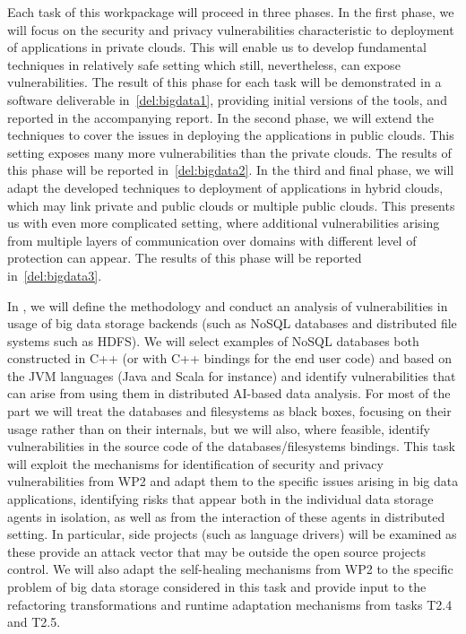 \begin{Workpackage}{\thewpno}
\begin{WPDescription}
Each task of this workpackage will proceed in three phases. In the first phase, we will focus on the security and privacy vulnerabilities characteristic to deployment of applications in private clouds. This will enable us to develop fundamental techniques in relatively safe setting which still, nevertheless, can expose vulnerabilities. The result of this phase for each task will be demonstrated in a software deliverable in~\ref{del:bigdata1}, providing initial versions of the tools, and reported in the accompanying report. In the second phase, we will extend the techniques to cover the issues in deploying the applications in public clouds. This setting exposes many more vulnerabilities than the private clouds. The results of this phase will be reported in~\ref{del:bigdata2}. In the third and final phase, we will adapt the developed techniques to deployment of applications in hybrid clouds, which may link private and public clouds or multiple public clouds. This presents us with even more complicated setting, where additional vulnerabilities arising from multiple layers of communication over domains with different level of protection can appear. The results of this phase will be reported in~\ref{del:bigdata3}.
\end{WPDescription}

\begin{Task}

\TaskResults{%
\ref{del:bigdata1}
\ref{del:bigdata2}
\ref{del:bigdata3}
}
\TaskHeader{}
In \theTask, we will define the methodology and conduct an analysis of vulnerabilities in usage of big data storage backends (such as NoSQL databases and distributed file systems such as HDFS).  We will select examples of NoSQL databases both constructed in C++ (or with C++ bindings for the end user code) and based on the JVM languages (Java and Scala for instance) and identify vulnerabilities that can arise from using them in distributed AI-based data analysis. For most of the part we will treat the databases and filesystems as black boxes, focusing on their usage rather than on their internals, but we will also, where feasible, identify vulnerabilities in the source code of the databases/filesystems bindings. This task will exploit the mechanisms for identification of security and privacy vulnerabilities from WP2 and adapt them to the specific issues arising in big data applications, identifying risks that appear both in the individual data storage agents in isolation, as well as from the interaction of these agents in distributed setting. In particular, side projects (such as language drivers) will be examined as these provide an attack vector that may be outside the open source projects control. We will 
also adapt the self-healing mechanisms from WP2 to the specific problem of big data storage considered in this task and provide input to the refactoring transformations and runtime adaptation mechanisms from tasks T2.4 and T2.5. 
 

\end{Task}
\end{Workpackage}
